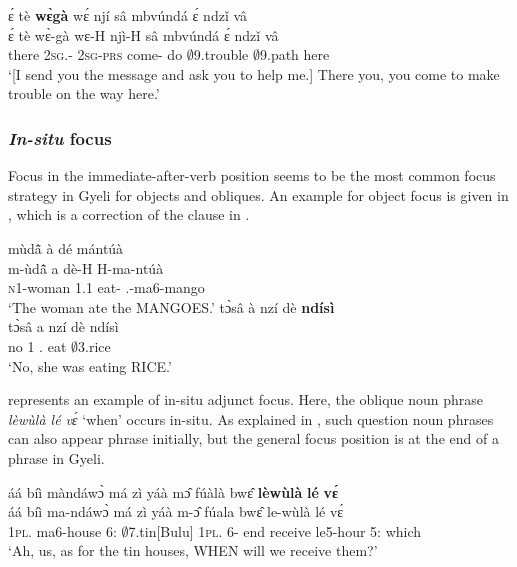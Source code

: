 \ea \label{ga3} 
  \glll ɛ́ tè {\bfseries wɛ̀gà} wɛ́ njí sâ mbvúndá ɛ́ ndzǐ vâ\\
        ɛ́ tè wɛ̀-gà wɛ-H njì-H sâ mbvúndá ɛ́ ndzǐ vâ\\
        {\LOC} there 2\textsc{sg}.{\SBJ}-{\CONTR} 2\textsc{sg}-\textsc{prs} come-{\R} do $\emptyset$9.trouble {\LOC} $\emptyset$9.path here\\
    \trans `[I send you the message and ask you to help me.] There you, you come to make trouble on the way here.'
\z





\subsubsection{{\itshape In-situ} focus}
\label{sec:insitu}

Focus in the immediate-after-verb position seems to be the most common focus strategy in Gyeli for objects and obliques. An example for object focus is given in , which is a correction of the clause in .

\ea \label{InsiO}
\ea \label{InsiOa}
   \glll mùdã̂ à dé mántúà\\
         m-ùdã̂ a dè-H H-ma-ntúà  \\
        \textsc{n}1-woman 1.{\PST}1 eat-{\R} {\OBJ}.{\LINK}-ma6-mango\\
    \trans `The woman ate the MANGOES.'
\ex \label{InsiOb}
  \glll tɔ̀sâ à nzí dè {\bfseries ndísì} \\
     tɔ̀sâ a nzí dè ndísì \\
       no 1 {\PROG}.{\PST} eat $\emptyset$3.rice\\
    \trans `No, she was eating RICE.'
\z
\z 

 represents an example of in-situ adjunct focus. Here, the oblique noun phrase {\itshape lèwùlà lé vɛ́} `when' occurs in-situ. As explained in , such question noun phrases can also appear phrase initially, but the general focus position is at the end of a phrase in Gyeli.


\ea \label{InsiX}
  \glll     áá bíì màndáwɔ̀ má zì yáà mɔ̂ fúàlà bwɛ̂ {\bfseries lèwùlà} {\bfseries lé} {\bfseries vɛ́}\\
          áá bíì ma-ndáwɔ̀ má zì yáà m-ɔ̂ fúala bwɛ̂ le-wùlà lé vɛ́\\
              {\EXCL} 1\textsc{pl}.{\OBJ} ma6-house 6:{\ATT} $\emptyset$7.tin[Bulu] 1\textsc{pl}.{\FUT} 6-{\OBJ} end receive le5-hour 5:{\ATT} which\\
    \trans `Ah, us, as for the tin houses, WHEN will we receive them?'
\z


